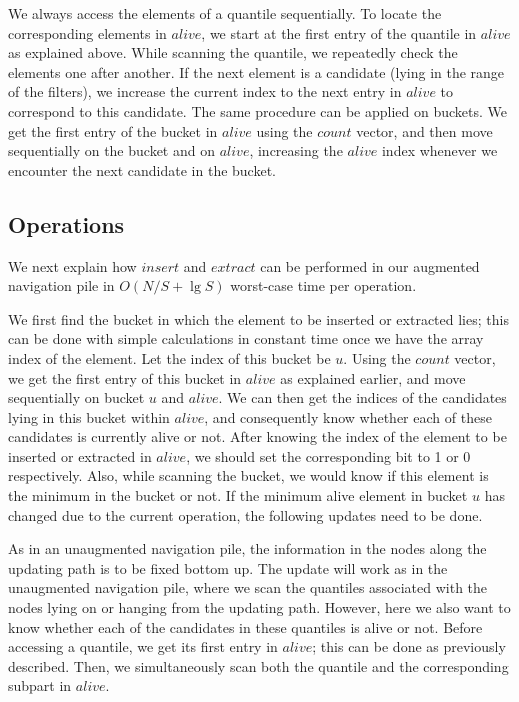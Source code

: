 \documentclass[final,onetabnum,onefignum,onethmnum]{siamltex}
\newcommand{\Insert}{\mbox{$\mathit{insert}$}}
\newcommand{\Extract}{\mbox{$\mathit{extract}$}}
\begin{document}
We always access the elements of a quantile
sequentially. To locate the corresponding elements in
$\mathit{alive}$, we start at the first entry of the quantile in
$\mathit{alive}$ as explained above. While
scanning the quantile, we repeatedly check the elements one after
another. If the next element is a candidate (lying in the range of the
filters), we increase the current index to the next entry in
$\mathit{alive}$ to correspond to this candidate.  The same procedure
can be applied on buckets. We get the first entry of the bucket
in $\mathit{alive}$ using the $\mathit{count}$ vector, and then move
sequentially on the bucket and on $\mathit{alive}$, increasing the
$\mathit{alive}$ index whenever we encounter the next candidate in the bucket.

\subsection{Operations} 
We next explain how \Insert{} and \Extract{} can be performed in our
augmented navigation pile in  $O(N/S + \lg S)$ worst-case time per operation.

We first find the bucket in which the element to be inserted or extracted
lies; this can be done with simple calculations in constant time once
we have the array index of the element. Let the index of this bucket
be $u$. Using the $\mathit{count}$ vector, we get the first entry of
this bucket in $\mathit{alive}$ as explained earlier, and move
sequentially on bucket $u$ and $\mathit{alive}$. We can then get the
indices of the candidates lying in this bucket within
$\mathit{alive}$, and consequently know whether each of these
candidates is currently alive or not. After knowing the index of the
element to be inserted or extracted in $\mathit{alive}$, we should set
the corresponding bit to 1 or 0 respectively. Also, while scanning the bucket, we
would know if this element is the minimum in the bucket or not. If the
minimum alive element in bucket $u$ has changed due to the current operation,
the following updates need to be done.

As in an unaugmented navigation pile, the information in the nodes along the updating path is to be fixed bottom up. 
The update will work as in the unaugmented navigation pile, where we scan the quantiles associated with the nodes lying on or hanging from the updating path. However, here we also want to know whether each of the candidates in these quantiles is alive or not.
Before accessing a quantile, we get its first entry in
$\mathit{alive}$; this can be done as previously described. 
Then, we simultaneously scan both the quantile and the corresponding subpart in $\mathit{alive}$.
\end{document}
